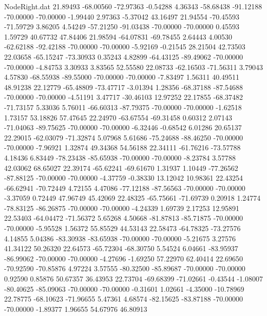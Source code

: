 \begin{filecontents}{NodeRight.dat}
  21.89493  -68.00560  -72.97363    -0.54288    4.36343  -58.68438  -91.12188  -70.00000  -70.00000   -1.99440    2.97363   -5.37042   43.16497
  21.94554  -70.45593  -71.59729     3.86205    4.54249  -57.21250  -91.03438  -70.00000  -70.00000    0.45593    1.59729   40.67732   47.84406
  21.98594  -64.07831  -69.78455     2.64443    4.00530  -62.62188  -92.42188  -70.00000  -70.00000   -5.92169   -0.21545   28.21504   42.73503
  22.03658  -65.15247  -73.30933     0.35243    4.82899  -64.43125  -89.49062  -70.00000  -70.00000   -4.84753    3.30933    3.83565   52.55580
  22.08733  -62.16503  -71.56311     3.79043    4.57830  -68.55938  -89.55000  -70.00000  -70.00000   -7.83497    1.56311   40.49511   48.91238
  22.12779  -65.48809  -73.47717    -3.01394    1.28356  -68.37188  -87.54688  -70.00000  -70.00000   -4.51191    3.47717  -30.46103   12.97252
  22.17855  -68.37482  -71.73157     5.33036    5.76011  -66.60313  -87.79375  -70.00000  -70.00000   -1.62518    1.73157   53.18826   57.47645
  22.24970  -63.67554  -69.31458     0.60312    2.07143  -71.04063  -89.75625  -70.00000  -70.00000   -6.32446   -0.68542    6.01286   20.65137
  22.29015  -62.03079  -71.32874     5.07968    5.61686  -75.24688  -88.46250  -70.00000  -70.00000   -7.96921    1.32874   49.34368   54.56188
  22.34111  -61.76216  -73.57788     4.18436    6.83449  -78.23438  -85.65938  -70.00000  -70.00000   -8.23784    3.57788   42.03062   68.65027
  22.39174  -65.62241  -69.61670     1.31937    1.10449  -77.26562  -87.88125  -70.00000  -70.00000   -4.37759   -0.38330   13.12042   10.98361
  22.43254  -66.62941  -70.72449     4.72155    4.47086  -77.12188  -87.56563  -70.00000  -70.00000   -3.37059    0.72449   47.96749   45.42069
  22.48325  -65.75661  -71.69739     0.20918    1.24774  -78.83125  -86.26875  -70.00000  -70.00000   -4.24339    1.69739    2.17253   12.95891
  22.53403  -64.04472  -71.56372     5.65268    4.50668  -81.87813  -85.71875  -70.00000  -70.00000   -5.95528    1.56372   55.85529   44.53143
  22.58473  -64.78325  -73.27576     4.14855    5.04386  -83.30938  -83.65938  -70.00000  -70.00000   -5.21675    3.27576   41.34122   50.26320
  22.64573  -65.72304  -68.30750     5.54524    6.04661  -83.95937  -86.99062  -70.00000  -70.00000   -4.27696   -1.69250   57.22970   62.40414
  22.69650  -70.92590  -70.85876     4.97224    3.57555  -80.32500  -85.89687  -70.00000  -70.00000    0.92590    0.85876   50.67357   36.43953
  22.73704  -69.68399  -71.02661    -0.43544   -1.08007  -80.40625  -85.09063  -70.00000  -70.00000   -0.31601    1.02661   -4.35000  -10.78969
  22.78775  -68.10623  -71.96655     5.47361    4.68574  -82.15625  -83.87188  -70.00000  -70.00000   -1.89377    1.96655   54.67976   46.80913

\end{filecontents}
